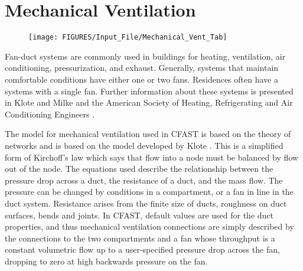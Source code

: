 

\chapter{Mechanical Ventilation}

\begin{figure}[h!]
\begin{center}
\texttt{[image: FIGURES/Input\_File/Mechanical\_Vent\_Tab]}
\end{center}
\end{figure}

Fan-duct systems are commonly used in buildings for heating, ventilation, air conditioning, pressurization, and exhaust. Generally, systems that maintain comfortable conditions have either one or two fans.  Residences often have a systems with a single fan. Further information about these systems is presented in  Klote and Milke \cite{Klote:2002} and the American Society of Heating, Refrigerating and Air Conditioning Engineers \cite{ASHRAE:2001}.

The model for mechanical ventilation used in CFAST is based on the theory of networks and is based on the model developed by Klote \cite{Klote:1988a}.  This is a simplified form of Kirchoff's law which says that flow into a node must be balanced by flow out of the node. The equations used describe the relationship between the pressure drop across a duct, the resistance of a duct, and the mass flow.  The pressure can be changed by conditions in a compartment, or a fan in line in the duct system.  Resistance arises from the finite size of ducts, roughness on duct surfaces, bends and joints. In CFAST, default values are used for the duct properties, and thus mechanical ventilation connections are simply described by the connections to the two compartments and a fan whose throughput is a constant volumetric flow up to a user-specified pressure drop across the fan, dropping to zero at high backwards pressure on the fan.

